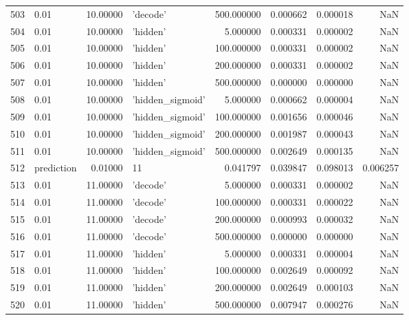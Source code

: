 \documentclass[10pt,a4paper]{article}
\begin{document}
\begin{tabular}{llrlrrrr}
503  &        0.01 &  10.00000 &           'decode' &  500.000000 &  0.000662 &  0.000018 &       NaN \\
504  &        0.01 &  10.00000 &           'hidden' &    5.000000 &  0.000331 &  0.000002 &       NaN \\
505  &        0.01 &  10.00000 &           'hidden' &  100.000000 &  0.000331 &  0.000002 &       NaN \\
506  &        0.01 &  10.00000 &           'hidden' &  200.000000 &  0.000331 &  0.000002 &       NaN \\
507  &        0.01 &  10.00000 &           'hidden' &  500.000000 &  0.000000 &  0.000000 &       NaN \\
508  &        0.01 &  10.00000 &   'hidden\_sigmoid' &    5.000000 &  0.000662 &  0.000004 &       NaN \\
509  &        0.01 &  10.00000 &   'hidden\_sigmoid' &  100.000000 &  0.001656 &  0.000046 &       NaN \\
510  &        0.01 &  10.00000 &   'hidden\_sigmoid' &  200.000000 &  0.001987 &  0.000043 &       NaN \\
511  &        0.01 &  10.00000 &   'hidden\_sigmoid' &  500.000000 &  0.002649 &  0.000135 &       NaN \\
512  &  prediction &   0.01000 &                 11 &    0.041797 &  0.039847 &  0.098013 &  0.006257 \\
513  &        0.01 &  11.00000 &           'decode' &    5.000000 &  0.000331 &  0.000002 &       NaN \\
514  &        0.01 &  11.00000 &           'decode' &  100.000000 &  0.000331 &  0.000022 &       NaN \\
515  &        0.01 &  11.00000 &           'decode' &  200.000000 &  0.000993 &  0.000032 &       NaN \\
516  &        0.01 &  11.00000 &           'decode' &  500.000000 &  0.000000 &  0.000000 &       NaN \\
517  &        0.01 &  11.00000 &           'hidden' &    5.000000 &  0.000331 &  0.000004 &       NaN \\
518  &        0.01 &  11.00000 &           'hidden' &  100.000000 &  0.002649 &  0.000092 &       NaN \\
519  &        0.01 &  11.00000 &           'hidden' &  200.000000 &  0.002649 &  0.000103 &       NaN \\
520  &        0.01 &  11.00000 &           'hidden' &  500.000000 &  0.007947 &  0.000276 &       NaN \\

\end{tabular}
\end{document}
